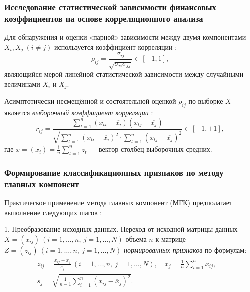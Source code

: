 \documentclass[14pt,a4paper]{extarticle}
\begin{document}
\subsubsection{Исследование статистической зависимости финансовых коэффициентов на основе корреляционного 
анализа}

Для обнаружения и оценки «парной» зависимости между двумя компонентами $X_{i}, X_{j}\ (i \neq j)$ 
используется коэффициент корреляции \cite{kharin2008}:
\begin{equation}
\rho_{ij} = \frac{\sigma_{ij}}{\sqrt{\sigma_{ii}\sigma_{jj}}} \in [-1,1],
\end{equation}
являющийся мерой линейной статистической зависимости между случайными величинами $X_{i}$ и $X_{j}$.

Асимптотически несмещённой и состоятельной оценкой $\rho_{ij}$ по выборке $X$ является \textit{выборочный 
коэффициент корреляции} \cite{kharin2008}:
\begin{equation}
r_{ij} = \frac{\sum_{t=1}^{n} (x_{ti} - \overline{x_{i}})(x_{tj} - \overline{x_{j}})}{\sqrt{\sum_{t=1}^{n} 
(x_{ti} - \overline{x_{i}})^{2} \cdot \sum_{t=1}^{n} (x_{tj} - \overline{x_{j}})^{2}}} \in [-1,+1],
\end{equation}
где $\overline{x} = (\overline{x_{i}}) = \frac{1}{n}\sum_{t=1}^{n} z_{t}$ --- вектор-столбец выборочных 
средних.



\subsubsection{Формирование классификационных признаков по методу главных компонент}

Практическое применение метода главных компонент (МГК) предполагает выполнение следующих шагов \cite{malugin2013}:

1. Преобразование исходных данных. Переход от исходной матрицы данных $X = (x_{ij})\ (i=1,\ldots,n,\ 
j=1,\ldots,N)$ объема $n$ к матрице $Z = (z_{ij})\ (i=1,\ldots,n,\ j=1,\ldots,N)$ 
\textit{нормированных признаков} по формулам:
\begin{equation}
\begin{gathered}
z_{ij} = \frac{x_{ij} - \overline{x}_{j}}{s_{j}}\ (i=1,\ldots,n,\ j=1,\ldots,N),\quad
\overline{x}_{j} = \frac{1}{n}\sum_{i=1}^{n} x_{ij},\quad \\
s_{j} = \sqrt{\frac{1}{n-1}\sum_{i=1}^{n} (x_{ij} - \overline{x}_{j})^{2}}.
\end{gathered}
\end{equation}
\end{document}
